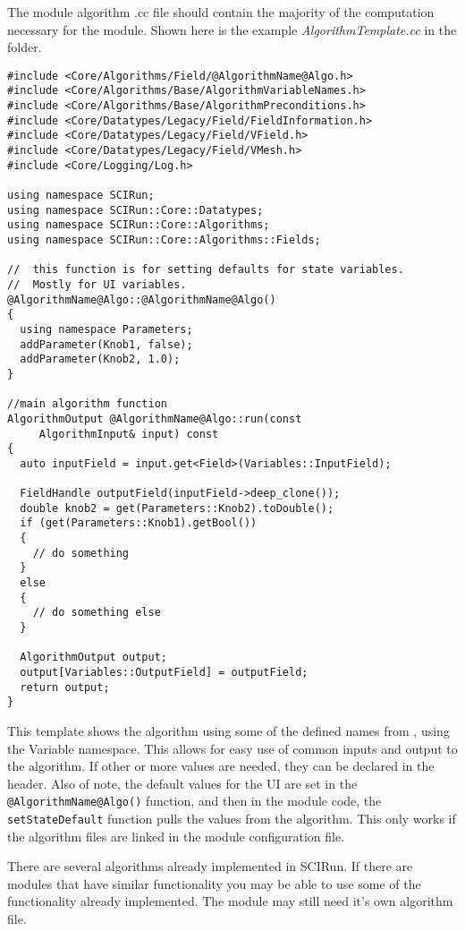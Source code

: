\documentclass[fleqn,11pt,openany]{book}
\begin{document}
The module algorithm .cc file should contain the majority of the computation necessary for the module.
Shown here is the example \emph{AlgorithmTemplate.cc} in the \emph{} folder.
\begin{verbatim}
#include <Core/Algorithms/Field/@AlgorithmName@Algo.h>
#include <Core/Algorithms/Base/AlgorithmVariableNames.h>
#include <Core/Algorithms/Base/AlgorithmPreconditions.h>
#include <Core/Datatypes/Legacy/Field/FieldInformation.h>
#include <Core/Datatypes/Legacy/Field/VField.h>
#include <Core/Datatypes/Legacy/Field/VMesh.h>
#include <Core/Logging/Log.h>

using namespace SCIRun;
using namespace SCIRun::Core::Datatypes;
using namespace SCIRun::Core::Algorithms;
using namespace SCIRun::Core::Algorithms::Fields;

//  this function is for setting defaults for state variables.  
//  Mostly for UI variables. 
@AlgorithmName@Algo::@AlgorithmName@Algo()
{
  using namespace Parameters;
  addParameter(Knob1, false);
  addParameter(Knob2, 1.0);
}

//main algorithm function
AlgorithmOutput @AlgorithmName@Algo::run(const 
     AlgorithmInput& input) const
{
  auto inputField = input.get<Field>(Variables::InputField);
  
  FieldHandle outputField(inputField->deep_clone());
  double knob2 = get(Parameters::Knob2).toDouble();
  if (get(Parameters::Knob1).getBool())
  {
    // do something
  }
  else
  {
    // do something else
  }

  AlgorithmOutput output;
  output[Variables::OutputField] = outputField;
  return output;
}
\end{verbatim}

This template shows the algorithm using some of the defined names from \emph{}, using the Variable namespace.
This allows for easy use of common inputs and output to the algorithm.  
If other or more values are needed, they can be declared in the header.  
Also of note, the default values for the UI are set in the \verb|@AlgorithmName@Algo()| function, and then in the module code, the \verb|setStateDefault| function pulls the values from the algorithm.  
This only works if the algorithm files are linked in the module configuration file. 

There are several algorithms already implemented in SCIRun.  
If there are modules that have similar functionality you may be able to use some of the functionality already implemented.  
The module may still need it's own algorithm file.  
\end{document}
